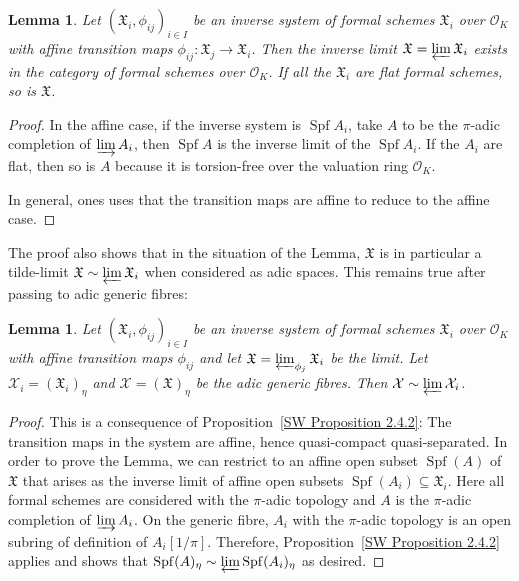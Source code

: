\documentclass[10pt,oneside]{amsart}
\newtheorem{lemma}[theorem]{Lemma}
\theoremstyle{definition}
\begin{document}
	\begin{lemma} \label{lemma:inverse_limit_formal}
		Let $(\mathfrak X_i,\phi_{ij})_{i\in I}$ be an inverse system of formal schemes $\mathfrak X_i$ over $\mathcal O_K$ with affine transition maps $\phi_{ij}:\mathfrak X_j\rightarrow \mathfrak X_i$. Then the inverse limit $\mathfrak X=\varprojlim \mathfrak X_i$ exists in the category of formal schemes over $\mathcal O_K$. If all the $\mathfrak X_i$ are flat formal schemes, so is $\mathfrak X$.
	\end{lemma}
	\begin{proof}
	In the affine case, if the inverse system is $\operatorname{Spf} A_i$, take $A$ to be the $\pi$-adic completion of $\varinjlim A_i$, then  $\operatorname{Spf} A$ is the inverse limit of the $\operatorname{Spf}A_i$. If the $A_i$ are flat, then so is $A$ because it is torsion-free over the valuation ring $\mathcal O_K$. 
	
	In general, ones uses that the transition maps are affine to reduce to the affine case. 
	\end{proof}
	
	The proof also shows that in the situation of the Lemma, $\mathfrak X$ is in particular a tilde-limit  $\mathfrak X\sim \varprojlim \mathfrak X_i$ when considered as adic spaces. This remains true after passing to adic generic fibres:
	
	\begin{lemma}\label{tilde-limit from adic generic fibre of formal schemes}
		Let $(\mathfrak X_i,\phi_{ij})_{i\in I}$ be an inverse system of formal schemes $\mathfrak X_i$ over $\mathcal O_K$ with affine transition maps $\phi_{ij}$ and let $\mathfrak X=\varprojlim_{\phi_j} \mathfrak X_i$ be the limit. Let $\mathcal X_i =(\mathfrak X_i)_\eta$ and  $\mathcal X = (\mathfrak X)_\eta$ be the adic generic fibres. Then $\mathcal X \sim \varprojlim \mathcal X_i$.
	\end{lemma}
	\begin{proof}
		This is a consequence of Proposition~\ref{SW Proposition 2.4.2}: The transition maps in the system are affine, hence quasi-compact quasi-separated. In order to prove the Lemma, we can restrict to an affine open subset $\operatorname{Spf}(A)$ of $\mathfrak X$ that arises as the inverse limit of affine open subsets $\operatorname{Spf}(A_i)\subseteq \mathfrak X_i$. Here all formal schemes are considered with the $\pi$-adic topology and $A$ is the $\pi$-adic completion of $\varinjlim A_i$. 
		On the generic fibre, $A_i$ with the $\pi$-adic topology is an open subring of definition of $A_i[1/\pi]$. Therefore, Proposition~\ref{SW Proposition 2.4.2} applies and shows that $\operatorname{Spf}(A)_\eta \sim \varprojlim \operatorname{Spf}(A_i)_\eta$ as desired.
	\end{proof}
	
\end{document}
